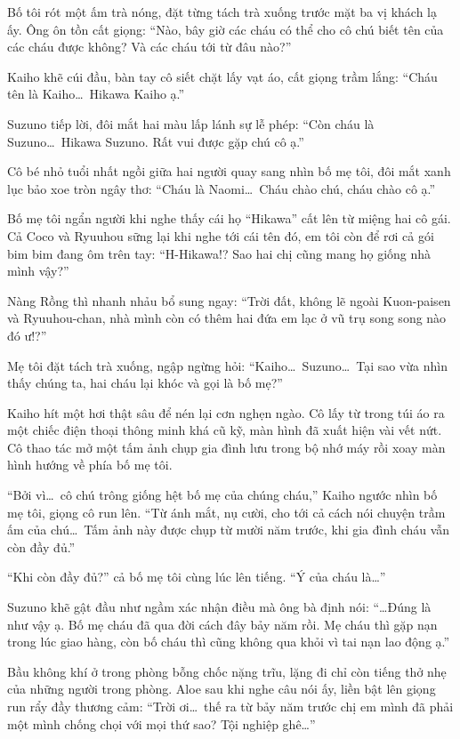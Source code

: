 ﻿\documentclass[../main.tex]{subfiles}
\begin{document}
Bố tôi rót một ấm trà nóng, đặt từng tách trà xuống trước mặt ba vị khách lạ ấy. Ông ôn tồn cất giọng: ``Nào, bây giờ các cháu có thể cho cô chú biết tên của các cháu được không? Và các cháu tới từ đâu nào?''

Kaiho khẽ cúi đầu, bàn tay cô siết chặt lấy vạt áo, cất giọng trầm lắng: ``Cháu tên là Kaiho\dots\ Hikawa Kaiho ạ.''

Suzuno tiếp lời, đôi mắt hai màu lấp lánh sự lễ phép: ``Còn cháu là Suzuno\dots\ Hikawa Suzuno. Rất vui được gặp chú cô ạ.''

Cô bé nhỏ tuổi nhất ngồi giữa hai người quay sang nhìn bố mẹ tôi, đôi mắt xanh lục bảo xoe tròn ngây thơ: ``Cháu là Naomi\dots\ Cháu chào chú, cháu chào cô ạ.''

Bố mẹ tôi ngẩn người khi nghe thấy cái họ ``Hikawa'' cất lên từ miệng hai cô gái. Cả Coco và Ryuuhou sững lại khi nghe tới cái tên đó, em tôi còn để rơi cả gói bim bim đang ôm trên tay: ``H-Hikawa!? Sao hai chị cũng mang họ giống nhà mình vậy?''

Nàng Rồng thì nhanh nhảu bổ sung ngay: ``Trời đất, không lẽ ngoài Kuon-paisen và Ryuuhou-chan, nhà mình còn có thêm hai đứa em lạc ở vũ trụ song song nào đó ư!?''

Mẹ tôi đặt tách trà xuống, ngập ngừng hỏi: ``Kaiho\dots\ Suzuno\dots\ Tại sao vừa nhìn thấy chúng ta, hai cháu lại khóc và gọi là bố mẹ?''

Kaiho hít một hơi thật sâu để nén lại cơn nghẹn ngào. Cô lấy từ trong túi áo ra một chiếc điện thoại thông minh khá cũ kỹ, màn hình đã xuất hiện vài vết nứt. Cô thao tác mở một tấm ảnh chụp gia đình lưu trong bộ nhớ máy rồi xoay màn hình hướng về phía bố mẹ tôi.

``Bởi vì\dots\ cô chú trông giống hệt bố mẹ của chúng cháu,'' Kaiho ngước nhìn bố mẹ tôi, giọng cô run lên. ``Từ ánh mắt, nụ cười, cho tới cả cách nói chuyện trầm ấm của chú\dots\ Tấm ảnh này được chụp từ mười năm trước, khi gia đình cháu vẫn còn đầy đủ.''

``Khi còn đầy đủ?'' cả bố mẹ tôi cùng lúc lên tiếng. ``Ý của cháu là\dots''

Suzuno khẽ gật đầu như ngầm xác nhận điều mà ông bà định nói: ``\dots Đúng là như vậy ạ. Bố mẹ cháu đã qua đời cách đây bảy năm rồi. Mẹ cháu thì gặp nạn trong lúc giao hàng, còn bố cháu thì cũng không qua khỏi vì tai nạn lao động ạ.''

Bầu không khí ở trong phòng bỗng chốc nặng trĩu, lặng đi chỉ còn tiếng thở nhẹ của những người trong phòng. Aloe sau khi nghe câu nói ấy, liền bật lên giọng run rẩy đầy thương cảm: ``Trời ơi\dots\ thế ra từ bảy năm trước chị em mình đã phải một mình chống chọi với mọi thứ sao? Tội nghiệp ghê\dots''
\end{document}
